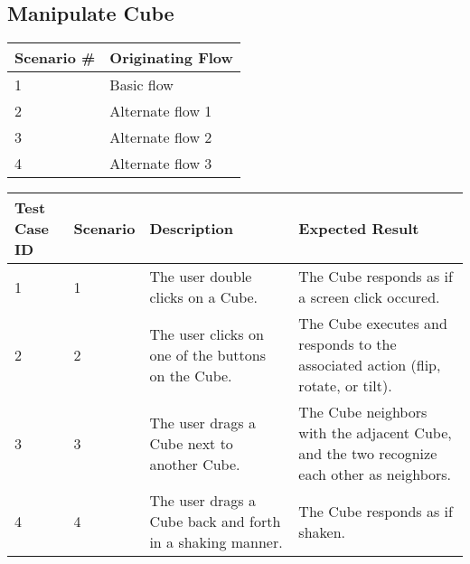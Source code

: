 \documentclass[12pt]{article}
\begin{document}
\clearpage

\subsection{Manipulate Cube}

\begin{table}[h!]
  \begin{tabular}{l | l}
    \textbf{Scenario \#} &
    \textbf{Originating Flow} \\ \hline

    1 &
    Basic flow \\ \hline

    2 &
    Alternate flow 1 \\ \hline

    3 &
    Alternate flow 2 \\ \hline

    4 &
    Alternate flow 3 \\ \hline

  \end{tabular}
\end{table}

\begin{table}[h!]
  \begin{tabular}{p{.5in} | p{.75in} | p{2.15in} | p{2.15in}}
    \textbf{Test Case ID} &
    \textbf{Scenario} &
    \textbf{Description} &
    \textbf{Expected Result} \\ \hline

    1 &
    1 &
    The user double clicks on a Cube. &
    The Cube responds as if a screen click occured. \\ \hline

    2 &
    2 &
    The user clicks on one of the buttons on the Cube. &
    The Cube executes and responds to the associated action (flip, rotate, or tilt). \\ \hline

    3 &
    3 &
    The user drags a Cube next to another Cube. &
    The Cube neighbors with the adjacent Cube, and the two recognize each other as neighbors. \\ \hline

    4 &
    4 &
    The user drags a Cube back and forth in a shaking manner. &
    The Cube responds as if shaken. \\ \hline

  \end{tabular}
\end{table}
\end{document}
